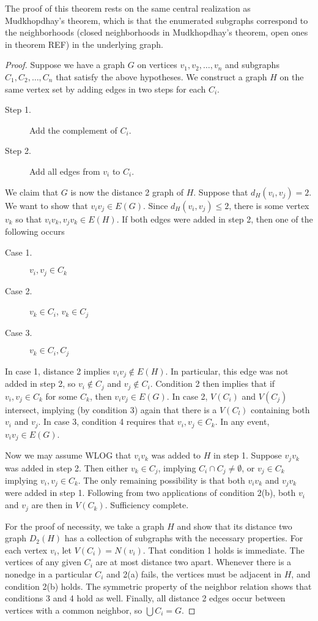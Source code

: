 The proof of this theorem rests on the same central realization as Mudkhopdhay's theorem, which is that the enumerated subgraphs correspond to the neighborhoods (closed neighborhoods in Mudkhopdhay's theorem, open ones in theorem REF) in the underlying graph.
\begin{proof}
Suppose we have a graph $G$ on vertices $v_1, v_2, \ldots, v_n$ and subgraphs $C_1, C_2, \ldots, C_n$ that satisfy the above hypotheses.  We construct a graph $H$ on the same vertex set by adding edges in two steps for each $C_i$.
\begin{description}
	\item[Step 1.] Add the complement of $C_i$.
	\item[Step 2.] Add all edges from $v_i$ to $C_i$.
\end{description}
	We claim that $G$ is now the distance 2 graph of $H$.  Suppose that $d_H(v_i, v_j) = 2$.  We want to show that $v_iv_j \in E(G)$.  Since $d_H(v_i,v_j) \leq 2$, there is some vertex $v_k$ so that $v_iv_k, v_jv_k \in E(H)$.  If both edges were added in step 2, then one of the following occurs
\begin{description}
	\item[Case 1.] $v_i, v_j \in C_k$
	\item[Case 2.] $v_k \in C_i$, $v_k \in C_j$
	\item[Case 3.] $v_k \in C_i, C_j$
\end{description}    
In case 1, distance 2 implies $v_iv_j \notin E(H)$. In particular, this edge was not added in step 2, so $v_i \notin C_j$ and $v_j \notin C_i$.  Condition 2 then implies that if $v_i, v_j \in C_k$ for some $C_k$, then $v_iv_j \in E(G)$.  In case 2, $V(C_i)$ and $V(C_j)$ intersect, implying (by condition 3) again that there is a $V(C_l)$ containing both $v_i$ and $v_j$.  In case 3, condition 4 requires that $v_i, v_j \in C_k$.  In any event, $v_iv_j \in E(G)$.

Now we may assume WLOG that $v_iv_k$ was added to $H$ in step 1.  Suppose $v_jv_k$ was added in step 2. Then either $v_k \in C_j$, implying $C_i \cap C_j \neq \emptyset$, or $v_j \in C_k$ implying $v_i, v_j \in C_k$.  The only remaining possibility is that both $v_iv_k$ and $v_jv_k$ were added in step 1.  Following from two applications of condition 2(b), both $v_i$ and $v_j$ are then in $V(C_k)$.  Sufficiency complete.

For the proof of necessity, we take a graph $H$ and show that its distance two graph $D_2(H)$ has a collection of subgraphs with the necessary properties.  For each vertex $v_i$, let $V(C_i) = N(v_i)$.  That condition 1 holds is immediate.  The vertices of any given $C_i$ are at most distance two apart.  Whenever there is a nonedge in a particular $C_i$ and 2(a) fails, the vertices must be adjacent in $H$, and condition 2(b) holds.  The symmetric property of the neighbor relation shows that conditions 3 and 4 hold as well.  Finally, all distance 2 edges occur between vertices with a common neighbor, so $\bigcup C_i = G$. 
\end{proof}

